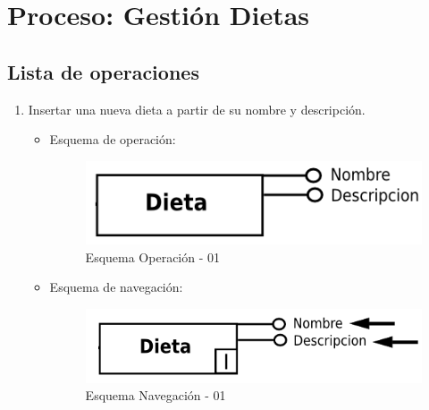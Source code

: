 \documentclass[a4paper,12pt]{report}
\begin{document}
\section{Proceso: Gestión Dietas}
\label{sec-7-5}
\subsection{Lista de operaciones}
\label{sec-7-5-1}
\begin{enumerate}
\item Insertar una nueva dieta a partir de su nombre y
descripción.
\begin{itemize}
\item Esquema de operación:
\begin{figure}[!htp]
\centering
\includegraphics[width=0.9\linewidth]{./operaciones/img/Dietas/01_ope.png}
\caption{Esquema Operación - 01}
\label{fig:ope01}
\medskip
\footnotesize
{}
\end{figure}
\item Esquema de navegación:
\begin{figure}[!htp]
\centering
\includegraphics[width=0.9\linewidth]{./operaciones/img/Dietas/01_nav.png}
\caption{Esquema Navegación - 01}
\label{fig:nave01}
\medskip
\footnotesize
{}
\end{figure}
\end{itemize}


\end{enumerate}
\end{document}
